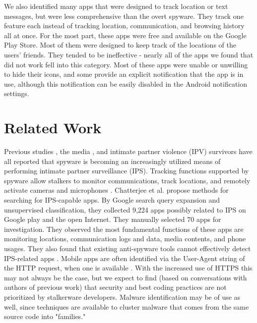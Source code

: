 \documentclass[acmtog]{acmart}
\begin{document}
We also identified many apps that were designed to track location or text 
messages, but were less comprehensive than the overt spyware. They 
track one feature each instead of tracking location, communication, and 
browsing history all at once. For the most part, these apps were free and 
available on the Google Play Store. Most of them were designed to keep track 
of the locations of the users' friends. They tended to be ineffective - nearly 
all of the apps we found that did not work fell into this category. Most of 
these apps were unable or unwilling to hide their icons, and some provide an 
explicit notification that the app is in use, although this notification can be 
easily disabled in the Android notification settings. 

\section{Related Work}
Previous studies \cite{stories_from_survivors, burke_using_2011}, the media 
\cite{shahani_smartphones_nodate, chatterjee_spyware_2018}, and intimate 
partner violence (IPV) survivors \cite{ristenpart_ucsd_talk} have all reported 
that spyware is becoming an increasingly utilized means of performing
intimate partner surveillance (IPS). Tracking functions supported by spyware 
allow stalkers to monitor communications, track locations, and remotely 
activate cameras and microphones \cite{shahani_smartphones_nodate, 
chatterjee_spyware_2018}. Chatterjee et al. propose methods for searching for 
IPS-capable apps. By Google search query expansion and unsupervised 
classification, they collected 9,224 apps possibly related to IPS on Google 
play and the open Internet. They manually selected 70 apps for investigation. 
They observed the most fundamental functions of these apps are 
monitoring locations, communication logs and data, media contents, and phone 
usages. They also found that existing anti-spyware tools cannot effectively 
detect IPS-related apps \cite{chatterjee_spyware_2018}.
Mobile apps are often identified via the User-Agent string of the HTTP request, 
when one is available \cite{xu_identifying_2011}. With the increased use of 
HTTPS this may not always 
be the case, but we expect to find (based on conversations with authors of 
previous work) that security and best coding practices are not prioritized by 
stalkerware developers. Malware identification may be of use as well, 
since techniques are available to cluster malware that comes from the same 
source code into "families." \cite{hutchison_firma_2013}
\end{document}
